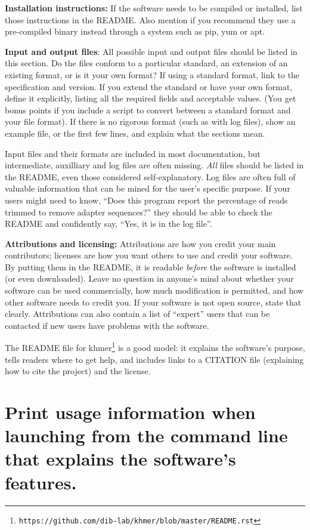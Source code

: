\documentclass[10pt,letterpaper]{article}
\newcommand{\withurl}[2]{{#1}\footnote{\texttt{#2}}}
\begin{document}
\textbf{Installation instructions:} If the software needs to be compiled
or installed, list those instructions in the README. Also
mention if you recommend they use a pre-compiled binary instead
through a system such as pip, yum or apt.

\textbf{Input and output files}: All possible input and output files
should be listed in this section. Do the files conform to a particular
standard, an extension of an existing format, or is it your own
format? If using a standard format, link to the specification and
version. If you extend the standard or have your own format, define it
explicitly, listing all the required fields and acceptable values.
(You get bonus points if you include a script to convert between
a standard format and your file format). If there is no rigorous format
(such as with log files), show an example file, or the first few lines,
and explain what the sections mean.

Input files and their formats are included in most documentation, but
intermediate, auxilliary and log files are often missing. 
\emph{All} files should be listed in the README, even those considered self-explanatory. Log
files are often full of valuable information that can be
mined for the user's specific purpose. If your users might need to know,
``Does this program report the percentage of reads trimmed to remove
adapter sequences?'' they should be able to check the README and confidently
say, ``Yes, it is in the log file''.

\textbf{Attributions and licensing:} Attributions are how you credit
your main contributors; licenses are how you want others to use and
credit your software. By putting them in the README, it is readable \emph{before}
the software is installed (or even downloaded).
Leave no
question in anyone's mind about whether your software can be used
commercially, how much modification is permitted, and how other software
needs to credit you. If your software is not open source, state that clearly.
Attributions can also contain a list of ``expert'' users
that can be contacted if new users have problems with the software.

The README file for \withurl{khmer}{https://github.com/dib-lab/khmer/blob/master/README.rst}
is a good model:
it explains the software's purpose,
tells readers where to get help,
and includes links to a CITATION file (explaining how to cite the project)
and the license.

\section{Print usage information when launching from the command line that explains the software's features.}
\end{document}
